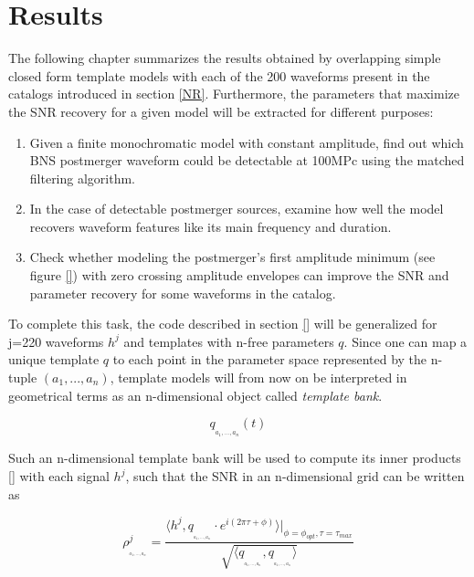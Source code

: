\chapter{Results}\label{res}

The following chapter summarizes the results obtained by overlapping simple closed form template models with each of the 200 waveforms present in the catalogs introduced in section \ref{NR}. Furthermore, the parameters that maximize the SNR recovery for a given model will be extracted for different purposes:

\begin{enumerate}
\item Given a finite monochromatic model with constant amplitude, find out which BNS postmerger waveform could be detectable at 100MPc using the matched filtering algorithm.

\item In the case of detectable postmerger sources, examine how well the model recovers waveform features like its main frequency and duration.

\item Check whether modeling the postmerger's first amplitude minimum (see figure \ref{}) with zero crossing amplitude envelopes can improve the SNR and parameter recovery for some waveforms in the catalog.

\end{enumerate}


To complete this task, the code described in section \ref{} will be generalized for j=220 waveforms $h^j$ and templates with n-free parameters $q$. Since one can map a unique template $q$ to each point in the parameter space represented by the n-tuple $(a_1,...,a_n)$, template models will from now on be interpreted in geometrical terms as an n-dimensional object called \textit{template bank}. 

\begin{equation}\label{ndim}
q_{_{a_1,...,a_n}}(t)
\end{equation}

Such an n-dimensional template bank will be used to compute its inner products \ref{} with each signal $h^j$, such that the SNR in an n-dimensional grid can be written as 

\begin{equation}\label{pul}
\rho^j_{_{_{a_1,...,a_n}}} = \frac{\langle h^j, q_{_{_{a_1,...,a_n}}}\cdot e^{i(2\pi \tau+\phi)}\rangle \bigg\rvert_{\phi =\phi_{opt},\tau =\tau_{max}}}{\sqrt{\langle  q_{_{_{a_1,...,a_n}}},q_{_{_{a_1,...,a_n}}} \rangle}}
\end{equation}


